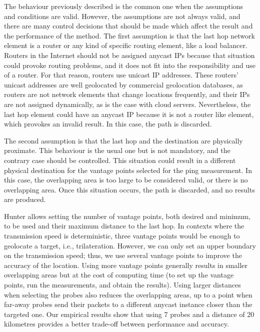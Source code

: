 The behaviour previously described is the common one when the assumptions and conditions are valid. However, the assumptions are not always valid, and there are many control decisions that should be made which affect the result and the performance of the method. The first assumption is that the last hop network element is a router or any kind of specific routing element, like a load balancer. Routers in the Internet should not be assigned anycast IPs because that situation could provoke routing problems, and it does not fit into the responsibility and use of a router. For that reason, routers use unicast IP addresses. These routers' unicast addresses are well geolocated by commercial geolocation databases, as routers are not network elements that change locations frequently, and their IPs are not assigned dynamically, as is the case with cloud servers. Nevertheless, the last hop element could have an anycast IP because it is not a router like element, which provokes an invalid result. In this case, the path is discarded.

The second assumption is that the last hop and the destination are physically proximate. This behaviour is the usual one but is not mandatory, and the contrary case should be controlled. This situation could result in a different physical destination for the vantage points selected for the ping measurement. In this case, the overlapping area is too large to be considered valid, or there is no overlapping area. Once this situation occurs, the path is discarded, and no results are produced. 

Hunter allows setting the number of vantage points, both desired and minimum, to be used and their maximum distance to the last hop. In contexts where the transmission speed is deterministic, three vantage points would be enough to geolocate a target, i.e., trilateration. However, we can only set an upper boundary on the transmission speed; thus, we use several vantage points to improve the accuracy of the location. Using more vantage points generally results in smaller overlapping areas but at the cost of computing time (to set up the vantage points, run the measurements, and obtain the results). Using larger distances when selecting the probes also reduces the overlapping areas, up to a point when far-away probes send their packets to a different anycast instance closer than the targeted one. Our empirical results show that using 7 probes and a distance of 20 kilometres provides a better trade-off between performance and accuracy.

